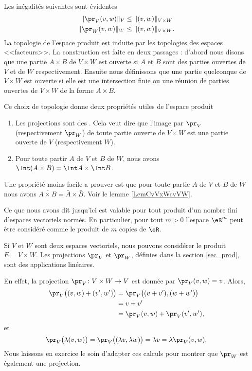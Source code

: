 Les inégalités suivantes sont évidentes
\begin{equation}
	\begin{aligned}[]
		\|\pr_V(v,w)\|_V&\leq \|(v,w)\|_{V\times W} \\
		\|\pr_W(v,w)\|_W&\leq \|(v,w)\|_{V\times W}.
	\end{aligned}
\end{equation}
La topologie de l'espace produit est induite par les topologies des espaces <<facteurs>>. La construction est faite en deux passages : d'abord nous disons que une partie $A\times B$ de $V\times W$ est ouverte si $A$ et $B$ sont des parties ouvertes de $V$ et de $W$ respectivement.  Ensuite nous définissons que une partie quelconque de $V\times W$ est ouverte si elle est une intersection finie ou une réunion de parties ouvertes de $V\times W$ de la forme $A\times B$. 

Ce choix de topologie donne deux propriétés utiles de l'espace produit 
\begin{enumerate}
	\item
		Les projections sont des . Cela veut dire que l'image par $\pr_V$ (respectivement $\pr_W$) de toute partie ouverte de $V\times W$ est une partie ouverte de $V$ (respectivement $W$). 
	\item 
		Pour toute partir $A$ de $V$ et $B$ de $W$, nous avons $\Int (A\times B)=\Int A\times \Int B$.\label{PgovlABeqbAbB}
\end{enumerate}
Une propriété moins facile a prouver est que pour toute partie $A$ de $V$ et $B$ de $W$ nous avons  $\overline{A\times B}=\bar{A}\times \bar{B}$. Voir le lemme \ref{LemCvVxWcvVW}.
  
Ce que nous avons dit jusqu'ici est valable pour tout produit d'un nombre fini d'espaces vectoriels normés. En particulier, pour tout $m>0$  l'espace  $\eR^m$ peut être considéré comme le produit de $m$ copies de $\eR$. 

\begin{example}
	Si $V$ et $W$ sont deux espaces vectoriels, nous pouvons considérer le produit $E=V\times W$. Les projections $\pr_V$ et $\pr_W$, définies dans la section \ref{sec_prod}, sont des applications linéaires. 

	En effet, la projection $\pr_V\colon V\times W\to V$ est donnée par $\pr_V(v,w)=v$. Alors,
	\begin{equation}
		\begin{aligned}[]
			\pr_V\big( (v,w)+(v',w') \big)&=\pr_V\big( (v+v'),(w+w') \big)\\
			&=v+v'\\
			&=\pr_V(v,w)+\pr_V(v',w'),
		\end{aligned}
	\end{equation}
	et
	\begin{equation}
		\pr_V\big( \lambda(v,w) \big)=\pr_V\big( (\lambda v,\lambda w) \big)=\lambda v=\lambda\pr_V(v,w).
	\end{equation}
	Nous laissons en exercice le soin d'adapter ces calculs pour montrer que $\pr_W$ est également une projection.
\end{example}


